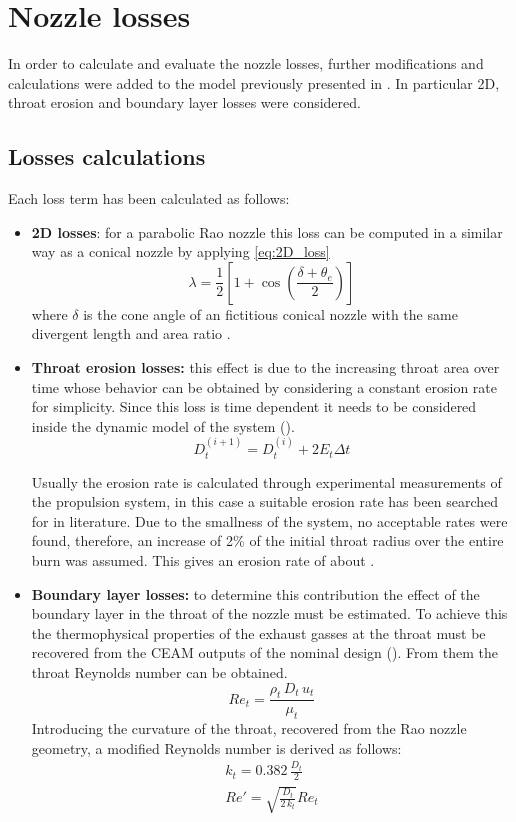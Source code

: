 \section{Nozzle losses}
\label{sec:nozzle_losses}

In order to calculate and evaluate the nozzle losses, further modifications and calculations were added to the model previously presented in \mref.
In particular 2D, throat erosion and boundary layer losses were considered.

\subsection{Losses calculations}  

Each loss term has been calculated as follows:
\begin{itemize}
    \item \textbf{2D losses}: for a parabolic Rao nozzle this loss can be computed in a similar way as a conical nozzle by applying \autoref{eq:2D_loss}
    \begin{equation}
        \lambda = \frac{1}{2} \left[ 1 + \cos \left( \frac{\delta + \theta_e}{2}\right)\right]
        \label{eq:2D_loss}
    \end{equation}
    where $\delta$ is the cone angle of an fictitious conical nozzle with the same divergent length and area ratio \cite{Sutton}.
    \item \textbf{Throat erosion losses:} this effect is due to the increasing throat area over time whose behavior can be obtained by considering a constant erosion rate for simplicity. Since this loss is time dependent it needs to be considered inside the dynamic model of the system (\mref).
    \begin{equation}
        D_t^{(i+1)} = D_t^{(i)} + 2 E_t \Delta t
    \end{equation}

    Usually the erosion rate is calculated through experimental measurements of the propulsion system, in this case a suitable erosion rate has been searched for in literature. Due to the smallness of the system, no acceptable rates were found, therefore, an increase of 2\% of the initial throat radius over the entire burn was assumed\cite{Sutton}\cite{tesi_malesia}. This gives an erosion rate of about \mref.
    \item \textbf{Boundary layer losses:} to determine this contribution the effect of the boundary layer in the throat of the nozzle must be estimated. To achieve this the thermophysical properties of the exhaust gasses at the throat must be recovered from the CEAM outputs of the nominal design (\mref). From them the throat Reynolds number can be obtained.
    \begin{equation}
        Re_t = \frac{\rho_t \, D_t \, u_t}{\mu_t}
    \end{equation}
Introducing the curvature of the throat, recovered from the Rao nozzle geometry, a modified Reynolds number is derived as follows:
    \begin{gather}
        k_t = 0.382 \, \frac{D_t}{2} \\
        Re'=\sqrt{\frac{D_t}{2 \, k_t}}Re_t
    \end{gather}  


\end{itemize}
